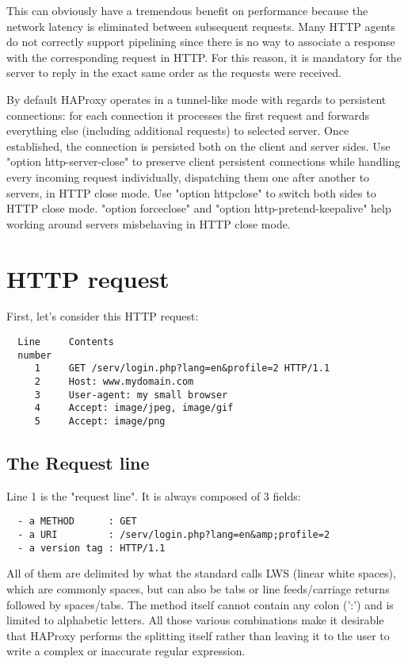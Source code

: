 This can obviously have a tremendous benefit on performance because the network
latency is eliminated between subsequent requests. Many HTTP agents do not
correctly support pipelining since there is no way to associate a response with
the corresponding request in HTTP. For this reason, it is mandatory for the
server to reply in the exact same order as the requests were received.

By default HAProxy operates in a tunnel-like mode with regards to persistent
connections: for each connection it processes the first request and forwards
everything else (including additional requests) to selected server. Once
established, the connection is persisted both on the client and server
sides. Use "option http-server-close" to preserve client persistent connections
while handling every incoming request individually, dispatching them one after
another to servers, in HTTP close mode. Use "option httpclose" to switch both
sides to HTTP close mode. "option forceclose" and "option
http-pretend-keepalive" help working around servers misbehaving in HTTP close
mode.


\section{HTTP request}

\begin{samepage}
First, let's consider this HTTP request:
\begin{verbatim}
  Line     Contents
  number
     1     GET /serv/login.php?lang=en&profile=2 HTTP/1.1
     2     Host: www.mydomain.com
     3     User-agent: my small browser
     4     Accept: image/jpeg, image/gif
     5     Accept: image/png
\end{verbatim}
\end{samepage}

\subsection{The Request line}
\begin{samepage}
Line 1 is the "request line". It is always composed of 3 fields:
\begin{verbatim}
  - a METHOD      : GET
  - a URI         : /serv/login.php?lang=en&amp;profile=2
  - a version tag : HTTP/1.1
\end{verbatim}
\end{samepage}

All of them are delimited by what the standard calls LWS (linear white spaces),
which are commonly spaces, but can also be tabs or line feeds/carriage returns
followed by spaces/tabs. The method itself cannot contain any colon (':') and
is limited to alphabetic letters. All those various combinations make it
desirable that HAProxy performs the splitting itself rather than leaving it to
the user to write a complex or inaccurate regular expression.

